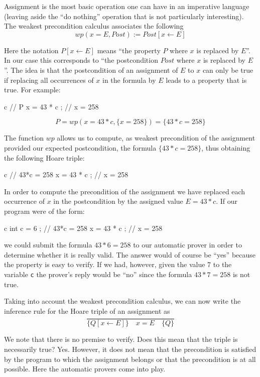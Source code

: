 


Assignment is the most basic operation one can have in an imperative
language (leaving aside the ``do nothing'' operation that is not particularly
interesting). The weakest precondition calculus associates the following
$$wp(x = E , Post) := Post[x \leftarrow E]$$


Here the notation $P[x \leftarrow E]$ means ``the property $P$ where
$x$ is replaced by $E$''. In our case this corresponds to ``the
postcondition $Post$ where $x$ is replaced by $E$''. The idea is
that the postcondition of an assignment of $E$ to $x$ can only be
true if replacing all occurrences of $x$ in the formula by $E$ leads
to a property that is true. For example:



\begin{CodeBlock}{c}
// { P }
x = 43 * c ;
// { x = 258 }
\end{CodeBlock}


$$P = wp(x = 43*c , \{x = 258\}) = \{43*c = 258\}$$


The function $wp$ allows us to compute, as weakest precondition of
the assignment provided our expected postcondition, the formula
$\{43*c = 258\}$, thus obtaining the following Hoare triple:


\begin{CodeBlock}{c}
// { 43*c = 258 }
x = 43 * c ;
// { x = 258 }
\end{CodeBlock}


In order to compute the precondition of the assignment we have replaced
each occurrence of $x$ in the postcondition by the assigned value
$E = 43*c$. If our program were of the form:
\begin{CodeBlock}{c}
int c = 6 ;
// { 43*c = 258 }
x = 43 * c ;
// { x = 258 }
\end{CodeBlock}
we could submit the formula $43*6 = 258$ to our automatic prover
in order to determine whether it is really valid. The answer would of
course be ``yes'' because the property is easy to verify. If we had,
however, given the value 7 to the variable \texttt{c} the prover's reply
would be ``no'' since the formula $43*7 = 258$ is not true.



Taking into account the weakest precondition calculus, we can now write
the inference rule for the Hoare triple of an assignment as
$$\dfrac{}{\{Q[x \leftarrow E] \}\quad x = E \quad\{ Q \}}$$


We note that there is no premise to verify. Does this mean that the
triple is necessarily true? Yes. However, it does not mean that the
precondition is satisfied by the program to which the assignment belongs
or that the precondition is at all possible. Here the automatic provers
come into play.



